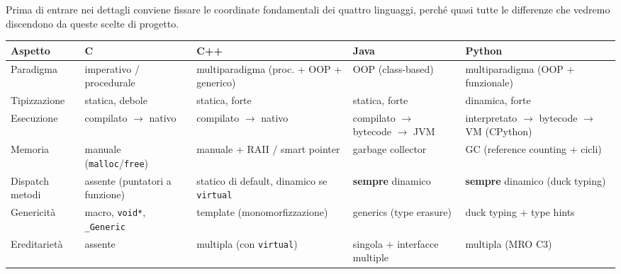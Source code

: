 \documentclass{report}
\newcommand{\code}[1]{\texttt{\small #1}}
\begin{document}
Prima di entrare nei dettagli conviene fissare le coordinate fondamentali dei
quattro linguaggi, perché quasi tutte le differenze che vedremo discendono da
queste scelte di progetto.


\begin{center}
\renewcommand{\arraystretch}{1.35}
\footnotesize
\begin{tabular}{|>{\raggedright\arraybackslash}p{2.6cm}|>{\raggedright\arraybackslash}p{2.5cm}|>{\raggedright\arraybackslash}p{2.8cm}|>{\raggedright\arraybackslash}p{2.6cm}|>{\raggedright\arraybackslash}p{2.6cm}|}
\hline
\textbf{Aspetto} & \textbf{C} & \textbf{C++} & \textbf{Java} & \textbf{Python} \\
\hline
Paradigma & imperativo / procedurale & multiparadigma (proc. + OOP + generico) & OOP (class-based) & multiparadigma (OOP + funzionale) \\
\hline
Tipizzazione & statica, debole & statica, forte & statica, forte & dinamica, forte \\
\hline
Esecuzione & compilato $\to$ nativo & compilato $\to$ nativo & compilato $\to$ bytecode $\to$ JVM & interpretato $\to$ bytecode $\to$ VM (CPython) \\
\hline
Memoria & manuale (\code{malloc}/\code{free}) & manuale + RAII / smart pointer & garbage collector & GC (reference counting + cicli) \\
\hline
Dispatch metodi & assente (puntatori a funzione) & statico di default, dinamico se \code{virtual} & \textbf{sempre} dinamico & \textbf{sempre} dinamico (duck typing) \\
\hline
Genericità & macro, \code{void*}, \code{\_Generic} & template (monomorfizzazione) & generics (type erasure) & duck typing + type hints \\
\hline
Ereditarietà & assente & multipla (con \code{virtual}) & singola + interfacce multiple & multipla (MRO C3) \\
\hline
\end{tabular}
\end{center}
\end{document}
